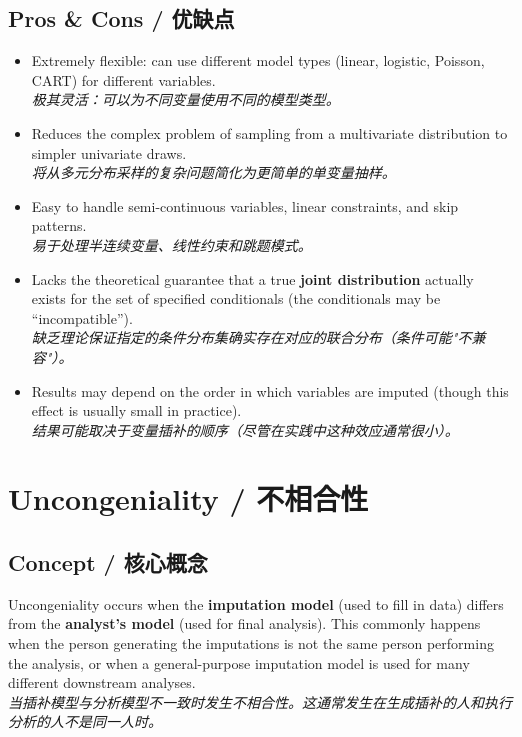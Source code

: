 \documentclass[9pt, a4paper]{article}
\begin{document}
\subsection{Pros \& Cons / 优缺点}
\begin{tcolorbox}[prosbox]
    \begin{itemize}
        \item [\ding{51}] Extremely flexible: can use different model types (linear, logistic, Poisson, CART) for different variables.\\
        \textit{极其灵活：可以为不同变量使用不同的模型类型。}
        \item [\ding{51}] Reduces the complex problem of sampling from a multivariate distribution to simpler univariate draws.\\
        \textit{将从多元分布采样的复杂问题简化为更简单的单变量抽样。}
        \item [\ding{51}] Easy to handle semi-continuous variables, linear constraints, and skip patterns.\\
        \textit{易于处理半连续变量、线性约束和跳题模式。}
    \end{itemize}
\end{tcolorbox}
\begin{tcolorbox}[consbox]
    \begin{itemize}
        \item [\ding{55}] Lacks the theoretical guarantee that a true \textbf{joint distribution} actually exists for the set of specified conditionals (the conditionals may be ``incompatible'').\\
        \textit{缺乏理论保证指定的条件分布集确实存在对应的联合分布（条件可能"不兼容"）。}
        \item [\ding{55}] Results may depend on the order in which variables are imputed (though this effect is usually small in practice).\\
        \textit{结果可能取决于变量插补的顺序（尽管在实践中这种效应通常很小）。}
    \end{itemize}
\end{tcolorbox}

\section{Uncongeniality / 不相合性}

\subsection{Concept / 核心概念}
\begin{tcolorbox}[defbox]
    Uncongeniality occurs when the \textbf{imputation model} (used to fill in data) differs from the \textbf{analyst's model} (used for final analysis). This commonly happens when the person generating the imputations is not the same person performing the analysis, or when a general-purpose imputation model is used for many different downstream analyses.\\
    \textit{当插补模型与分析模型不一致时发生不相合性。这通常发生在生成插补的人和执行分析的人不是同一人时。}
\end{tcolorbox}
\end{document}
